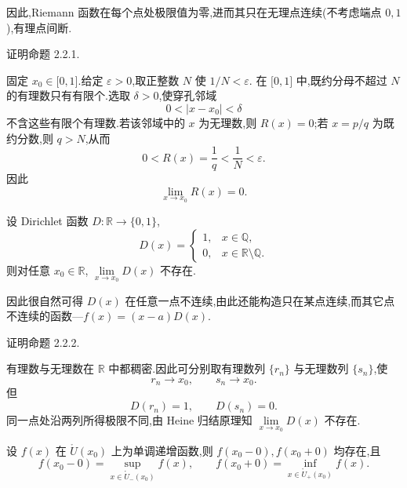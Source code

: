 \begin{remark}
    因此,Riemann 函数在每个点处极限值为零,进而其只在无理点连续(不考虑端点 $0,1$),有理点间断.
\end{remark}

\begin{example}
    证明命题 2.2.1.
\end{example}
\exampleblank

\begin{solution}
    固定 $x_0\in\lbrack0,1\rbrack$.给定 $\varepsilon>0$,取正整数 $N$ 使 $1/N<\varepsilon$.
    在 $\lbrack0,1\rbrack$ 中,既约分母不超过 $N$ 的有理数只有有限个.选取 $\delta>0$,使穿孔邻域
    \[
        0<|x-x_0|<\delta
    \]
    不含这些有限个有理数.若该邻域中的 $x$ 为无理数,则 $R(x)=0$;若
    $x=p/q$ 为既约分数,则 $q>N$,从而
    \[
        0<R(x)=\dfrac{1}{q}<\dfrac{1}{N}<\varepsilon.
    \]
    因此
    \[
        \lim\limits_{x\to x_0}R(x)=0.
    \]
\end{solution}

\begin{proposition}
    设 Dirichlet 函数 $D:\mathbb{R}\to\{0,1\}$,
    \[
        D(x)=
        \begin{cases}
            1, & x\in\mathbb{Q},                    \\
            0, & x\in\mathbb{R}\setminus\mathbb{Q}.
        \end{cases}
    \]
    则对任意 $x_0\in\mathbb{R}$,
    $\displaystyle\lim\limits_{x\to x_0}D(x)$ 不存在.
\end{proposition}

\begin{remark}
    因此很自然可得 $D(x)$ 在任意一点不连续,由此还能构造只在某点连续,而其它点不连续的函数---$f(x)=(x-a)D(x)$.
\end{remark}

\begin{example}
    证明命题 2.2.2.
\end{example}
\exampleblank

\begin{solution}
    有理数与无理数在 $\mathbb{R}$ 中都稠密.因此可分别取有理数列 $\{r_n\}$ 与无理数列 $\{s_n\}$,使
    \[
        r_n\to x_0,
        \qquad
        s_n\to x_0.
    \]
    但
    \[
        D(r_n)=1,
        \qquad
        D(s_n)=0.
    \]
    同一点处沿两列所得极限不同,由 Heine 归结原理知
    $\displaystyle\lim\limits_{x\to x_0}D(x)$ 不存在.
\end{solution}

\begin{proposition}
    设 $f(x)$ 在 $\mathring{U}(x_0)$ 上为单调递增函数,则 $f(x_0-0),f(x_0+0)$ 均存在,且
    \[
        f(x_0-0)=\sup\limits_{x\in\mathring{U}_{-}(x_0)}f(x),
        \qquad
        f(x_0+0)=\inf\limits_{x\in\mathring{U}_{+}(x_0)}f(x).
    \]
\end{proposition}

